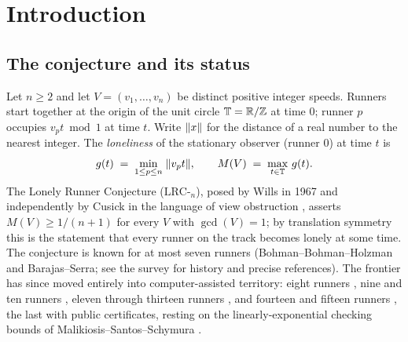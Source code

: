 \section{Introduction}\label{sec:intro}

\subsection{The conjecture and its status}

Let $n\ge 2$ and let $V=(v_1,\dots,v_n)$ be distinct positive integer
speeds. Runners start together at the origin of the unit circle
$\mathbb{T}=\mathbb{R}/\mathbb{Z}$ at time $0$; runner $p$ occupies $v_p t \bmod 1$ at time $t$.
Write $\lVert x \rVert$ for the distance of a real number to the nearest integer.
The \emph{loneliness} of the stationary observer (runner $0$) at time $t$
is
\[
g(t)\;=\;\min_{1\le p\le n}\;\lVert v_p t \rVert,
\qquad
M(V)\;=\;\max_{t\in\mathbb{T}}\,g(t).
\]
The Lonely Runner Conjecture ($\mathrm{LRC}$-$_n$), posed by Wills in 1967
and independently by Cusick in the language of view obstruction
\cite{PS-survey,Wills,Cusick1973}, asserts $M(V)\ge 1/(n{+}1)$ for every $V$ with
$\gcd(V)=1$; by translation symmetry this is the statement that every
runner on the track becomes lonely at some time. The conjecture is known
for at most seven runners (Bohman--Bohman--Holzman and
Barajas--Serra; see the survey \cite{PS-survey} for history and precise
references). The frontier has since moved entirely into computer-assisted
territory: eight runners \cite{Rosenfeld8}, nine and ten runners
\cite{Trakulthongchai}, eleven through thirteen runners
\cite{Sungkawichai}, and fourteen and fifteen runners \cite{Allikvere},
the last with public certificates, resting on the linearly-exponential
checking bounds of Malikiosis--Santos--Schymura \cite{MSS}.


